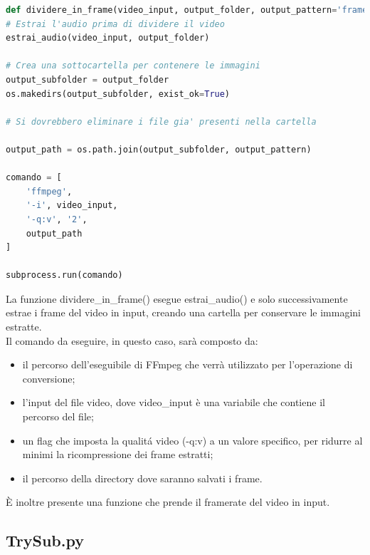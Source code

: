 \documentclass{report}
\begin{document}
\begin{lstlisting}[language=Python, breaklines=true, frame=single]
def dividere_in_frame(video_input, output_folder, output_pattern='frame_%04d.png', fps=1):
# Estrai l'audio prima di dividere il video
estrai_audio(video_input, output_folder)

# Crea una sottocartella per contenere le immagini
output_subfolder = output_folder
os.makedirs(output_subfolder, exist_ok=True)

# Si dovrebbero eliminare i file gia' presenti nella cartella

output_path = os.path.join(output_subfolder, output_pattern)

comando = [
    'ffmpeg',
    '-i', video_input,
    '-q:v', '2',
    output_path
]

subprocess.run(comando)

\end{lstlisting}
La funzione dividere\_in\_frame() esegue estrai\_audio() e solo successivamente estrae i frame del video in input, creando una cartella per conservare le immagini estratte. \\
Il comando da eseguire, in questo caso, sarà composto da: \\
\begin{itemize}
        \item
        il percorso dell'eseguibile di FFmpeg che verrà utilizzato per l'operazione di conversione;
        \item
        l’input del file video, dove video\_input è una variabile che contiene il percorso del file;
  \item
        un flag che imposta la qualitá video (-q:v) a un valore specifico, per ridurre al minimi la ricompressione dei frame estratti;
  \item
        il percorso della directory dove saranno salvati i frame.
\end{itemize}

È inoltre presente una funzione che prende il framerate del video in input.

\subsection{TrySub.py}
\end{document}
